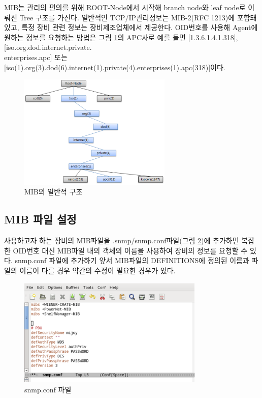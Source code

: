 \documentclass[11pt
  , a4paper
  , article
  , oneside
]{memoir}
\begin{document}
\hfil\break
\hfil\break
\hfil\break
\hfil\break
\hfil\break
\hfil\break

MIB는 관리의 편의를 위해 ROOT-Node에서 시작해 branch node와 leaf node로 이뤄진 Tree 구조를 가진다. 일반적인 TCP/IP관리정보는 MIB-2(RFC 1213)에 포함돼 있고, 특정 장비 관련 정보는 장비제조업체에서 제공한다. OID번호를 사용해 Agent에 원하는 정보를 요청하는 방법은 그림 \ref{fig:oid_tree}의 APC사로 예를 들면 [1.3.6.1.4.1.318], [iso.org.dod.internet.private.\\enterprises.apc] 또는 [iso(1).org(3).dod(6).internet(1).private(4).enterprises(1).apc(318)]이다.

\begin{figure}[h!]
  \centering
  \includegraphics[width=0.65\textwidth]{./images/oid_tree.eps}
  \caption{MIB의 일반적 구조}
  \label{fig:oid_tree} 
\end{figure}

\subsection{MIB 파일 설정}
사용하고자 하는 장비의 MIB파일을 .snmp/snmp.conf파일(그림 \ref{fig:snmp_conf})에 추가하면 복잡한 OID번호 대신 MIB파일 내의 객체의 이름을 사용하여 장비의 정보를 요청할 수 있다.
snmp.conf 파일에 추가하기 앞서 MIB파일의 DEFINITIONS에 정의된 이름과 파일의 이름이 다를 경우 약간의 수정이 필요한 경우가 있다. 
\begin{figure}[h]
  \centering
  \includegraphics[width=0.79\textwidth]{./images/snmp_conf.eps}
  \caption{snmp.conf 파일}
  \label{fig:snmp_conf}   
\end{figure}
\end{document}

